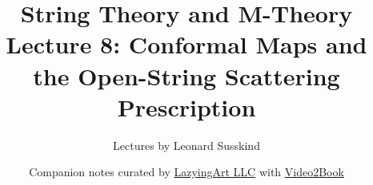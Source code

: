 \documentclass[11pt,oneside]{book}
\begin{document}
\hypersetup{pageanchor=false}
\frontmatter
\title{String Theory and M-Theory\\[0.45em]
\large Lecture 8: Conformal Maps and the Open-String Scattering Prescription}
\author{Lectures by Leonard Susskind}
\date{Companion notes curated by
\href{https://lazying.art}{LazyingArt LLC} with
\href{https://github.com/lachlanchen/Video2Book}{Video2Book}}
\maketitle
\clearpage
\hypersetup{pageanchor=true}
\mainmatter

\end{document}

